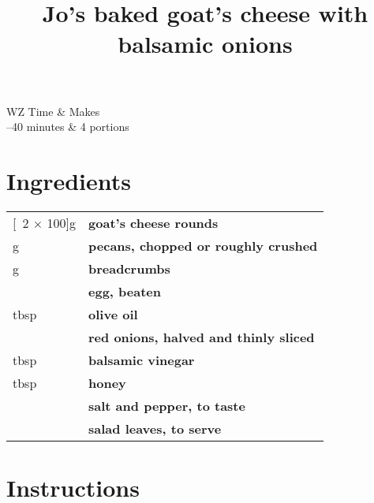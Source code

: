 \documentclass[main.tex]{subfiles}
\title{Jo's baked goat’s cheese with balsamic onions}
\begin{document}
\maketitle

\begin{margintable}
\begin{tabularx}{\textwidth}{WZ}
Time & Makes\\ 
--40 minutes & 4 portions\\
\end{tabularx}
\end{margintable}


\section{Ingredients}

\vspace*{-\baselineskip}
\begin{table}[ht]
	\begin{tabularx}{\textwidth}{>{\hsize=0.333\hsize}X>{\bf\hsize=1\hsize}X}
	\unit[2 $\times$ 100]{g} & goat's cheese rounds\\
	\unit[50]{g} & pecans, chopped or roughly crushed\\
	\unit[25]{g} & breadcrumbs\\
	\unit[1]{} & egg, beaten\\
	\unit[3]{tbsp} & olive oil \\
	\unit[2]{} & red onions, halved and thinly sliced \\
	\unit[4]{tbsp} & balsamic vinegar \\
	\unit[4]{tbsp} & honey \\
    \unit[]{} & salt and pepper, to taste \\
    \unit[]{} & salad leaves, to serve
	\end{tabularx}
\end{table}

\section{Instructions}
\end{document}
